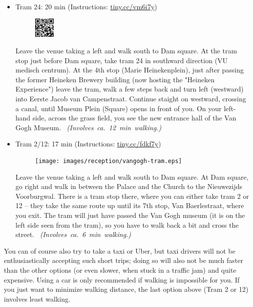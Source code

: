 \begin{itemize}
\pagebreak
\item Tram 24: \hfill 20 min (Instructions: \url{tiny.cc/vm6i7y})

\begin{minipage}{.9\textwidth}
\begin{figure}
\vspace*{-1.2\baselineskip}%
\includegraphics[width=1cm]{images/reception/vangogh-tram-24.png}
\end{figure}
Leave the venue taking a left and walk south to Dam square. At the tram stop just before Dam square, take tram 24 in southward direction (VU medisch centrum). At the 4th stop (Marie Heinekenplein), just after passing the former Heineken Brewery building (now hosting the "Heineken Experience") leave the tram, walk a few steps back and turn left (westward) into Eerste Jacob van Campenstraat. Continue staight on westward, crossing a canal, until Museum Plein (Square) opens in front of you. On your left-hand side, across the grass field, you see the new entrance hall of the Van Gogh Museum.
~\hspace*{\fill}\mbox{\emph{(Involves ca.\ 12 min walking.)}}
\end{minipage}

\item Tram 2/12: \hfill 17 min (Instructions: \url{tiny.cc/fdkf7y})

\begin{minipage}{.9\textwidth}
\begin{figure}
\vspace*{-1.2\baselineskip}%
\texttt{[image: images/reception/vangogh-tram.eps]}
\end{figure}
Leave the venue taking a left and walk south to Dam square. At Dam square, go right and walk in between the Palace and the Church to the Nieuwezijds Voorburgwal. There is a tram stop there, where you can either take tram 2 or 12  -- they take the same route up until its 7th stop, Van Baerlestraat, where you exit. The tram will just have passed the Van Gogh museum (it is on the left side seen from the tram), so you have to walk back a bit and cross the street.
~\hspace*{\fill}\mbox{\emph{(Involves ca.\ 6 min walking.)}}
\end{minipage}

\end{itemize}

You can of course also try to take a taxi or Uber, but taxi drivers will not be enthusiastically accepting such short trips; doing so will also not be much faster than the other options (or even slower, when stuck in a traffic jam) and quite expensive. Using a car is only recommended if walking is impossible for you. If you just want to minimize walking distance, the last option above (Tram 2 or 12) involves least walking.
